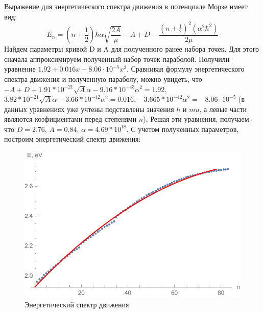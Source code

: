 \documentclass[a4paper, 12pt]{article}
\begin{document}
Выражение для энергетического спектра движения в потенциале Морзе имеет вид:
\begin{equation*}
	E_n=\left(n+\frac{1}{2}\right)\hbar\alpha\sqrt{\frac{2A}{\mu}}-A+D-\frac{\left(n+\frac{1}{2}\right)^2(\alpha^2\hbar^2)}{2\mu}
\end{equation*}
Найдем параметры кривой D и A для полученного ранее набора точек. Для этого сначала аппроксимируем полученный набор точек параболой. Получили уравнение $1.92 + 0.016 x - 8.06\cdot 10^{-5} x^2$. Сравнивая формулу энергетического спектра движения и полученную параболу, можно увидеть, что $-A + D + 1.91*10^{-21} \sqrt{A} \alpha - 9.16*10^{-43} \alpha^2=1.92$, $3.82*10^{-21} \sqrt{A} \alpha - 3.66*10^{-42} \alpha^2=0.016$, $-3.665*10^{-42} \alpha^2=- 8.06\cdot 10^{-5}$ (в данных уравнениях уже учтены подставлены значения $\hbar$ и $mu$, а левые части являются коэфициентами перед степенями $n$). Решая эти уравнения, получаем, что $D=2.76$, $A=0.84$, $\alpha=4.69*10^{18}$. С учетом полученных параметров, построим энергетический спектр движения:
\begin{figure}[!htb]
\centering
\includegraphics[scale=0.9]{plot9.pdf}
\caption{Энергетический спектр движения}
\end{figure}
\end{document}
